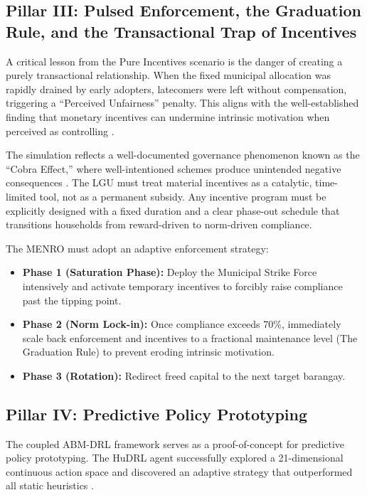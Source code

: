 \subsection{Pillar III: Pulsed Enforcement, the Graduation Rule, and the Transactional Trap of Incentives}

A critical lesson from the Pure Incentives scenario is the danger of creating a purely transactional relationship. When the fixed municipal allocation was rapidly drained by early adopters, latecomers were left without compensation, triggering a ``Perceived Unfairness'' penalty. This aligns with the well-established finding that monetary incentives can undermine intrinsic motivation when perceived as controlling \citep{Chen2023, Zhao2022}.

The simulation reflects a well-documented governance phenomenon known as the ``Cobra Effect,'' where well-intentioned schemes produce unintended negative consequences \citep{Weaver1986}. The LGU must treat material incentives as a catalytic, time-limited tool, not as a permanent subsidy. Any incentive program must be explicitly designed with a fixed duration and a clear phase-out schedule that transitions households from reward-driven to norm-driven compliance.

The MENRO must adopt an adaptive enforcement strategy:
\begin{itemize}
    \item \textbf{Phase 1 (Saturation Phase):} Deploy the Municipal Strike Force intensively and activate temporary incentives to forcibly raise compliance past the tipping point.
    \item \textbf{Phase 2 (Norm Lock-in):} Once compliance exceeds 70\%, immediately scale back enforcement and incentives to a fractional maintenance level (The Graduation Rule) to prevent eroding intrinsic motivation.
    \item \textbf{Phase 3 (Rotation):} Redirect freed capital to the next target barangay.
\end{itemize}

\subsection{Pillar IV: Predictive Policy Prototyping}
The coupled ABM-DRL framework serves as a proof-of-concept for predictive policy prototyping. The HuDRL agent successfully explored a 21-dimensional continuous action space and discovered an adaptive strategy that outperformed all static heuristics \citep{Jimenez2025, ZhengAI2022}.

